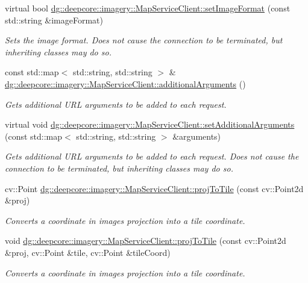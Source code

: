 \begin{DoxyCompactItemize}
virtual bool \hyperlink{group___imagery_module_ga9c0fa65750aaf5c860f046eccf6f0fe7}{dg\+::deepcore\+::imagery\+::\+Map\+Service\+Client\+::set\+Image\+Format} (const std\+::string \&image\+Format)
\begin{DoxyCompactList}\small\item\em Sets the image format. Does not cause the connection to be terminated, but inheriting classes may do so. \end{DoxyCompactList}\item 
const std\+::map$<$ std\+::string, std\+::string $>$ \& \hyperlink{group___imagery_module_gae806d1f279ef82bd45c8375e96936836}{dg\+::deepcore\+::imagery\+::\+Map\+Service\+Client\+::additional\+Arguments} ()
\begin{DoxyCompactList}\small\item\em Gets additional U\+RL arguments to be added to each request. \end{DoxyCompactList}\item 
virtual void \hyperlink{group___imagery_module_gac4ab75cb614415087330a2bc36b3a8d7}{dg\+::deepcore\+::imagery\+::\+Map\+Service\+Client\+::set\+Additional\+Arguments} (const std\+::map$<$ std\+::string, std\+::string $>$ \&arguments)
\begin{DoxyCompactList}\small\item\em Gets additional U\+RL arguments to be added to each request. Does not cause the connection to be terminated, but inheriting classes may do so. \end{DoxyCompactList}\item 
cv\+::\+Point \hyperlink{group___imagery_module_gadac27fac13942e9aa0717191107da278}{dg\+::deepcore\+::imagery\+::\+Map\+Service\+Client\+::proj\+To\+Tile} (const cv\+::\+Point2d \&proj)
\begin{DoxyCompactList}\small\item\em Converts a coordinate in image\textquotesingle{}s projection into a tile coordinate. \end{DoxyCompactList}\item 
void \hyperlink{group___imagery_module_gafc62330e9990a5048dd7ce44cdfb489d}{dg\+::deepcore\+::imagery\+::\+Map\+Service\+Client\+::proj\+To\+Tile} (const cv\+::\+Point2d \&proj, cv\+::\+Point \&tile, cv\+::\+Point \&tile\+Coord)
\begin{DoxyCompactList}\small\item\em Converts a coordinate in image\textquotesingle{}s projection into a tile coordinate. \end{DoxyCompactList}\item 

\end{DoxyCompactItemize}
